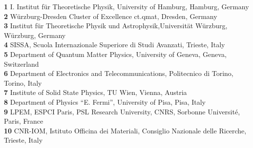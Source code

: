 \documentclass[dvipsnames]{SciPost}
\begin{document}
\begin{center}
%
%
  \newcommand{\CNRIOM}{CNR-IOM, Istituto Officina dei Materiali,
  Consiglio Nazionale delle Ricerche, Trieste, Italy}
\newcommand{\SISSA}{SISSA, Scuola Internazionale Superiore di Studi Avanzati, Trieste, Italy}
\newcommand{\ITPHamburg}{I. Institut f\"ur Theoretische Physik,
  University of Hamburg, Hamburg, Germany}
\newcommand{\WZBURG}{Institut f\"ur Theoretische Physik und
  Astrophysik,Universit\"at W\"urzburg, W\"urzburg, Germany}
\newcommand{\CTQMAT}{W\"urzburg-Dresden Cluster of Excellence ct.qmat, Dresden, Germany}
\newcommand{\Geneve}{Department of Quantum Matter Physics, University of
  Geneva, Geneva, Switzerland}
\newcommand{\UPISA}{Department of Physics ``E. Fermi'', University of
  Pisa, Pisa, Italy}
\newcommand{\ESPCI}{LPEM, ESPCI Paris, PSL Research University, CNRS, Sorbonne Universit\'e, Paris, France}
\newcommand{\TUW}{Institute of Solid State Physics, TU Wien, Vienna, Austria}
\newcommand{\ToPoli}{Department of Electronics and Telecommunications, Politecnico di Torino, Torino, Italy}
{\small
{\bf 1} \ITPHamburg\\
{\bf 2} \CTQMAT\\
{\bf 3} \WZBURG\\
{\bf 4} \SISSA\\
{\bf 5} \Geneve\\
{\bf 6} \ToPoli\\
{\bf 7} \TUW\\   
{\bf 8} \UPISA\\
{\bf 9} \ESPCI\\
{\bf 10} \CNRIOM\\
}
\end{center}
\end{document}
